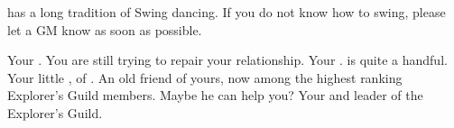 \documentclass[char]{NeptuneBall}
\begin{document}
\begin{itemz}[Notes]
  \item \pAmerica{} has a long tradition of Swing dancing. If you do not know how to swing, please let a GM know as soon as possible.
\end{itemz}

\begin{contacts}
  \contact{\cKing{}} Your \cKing{\parent}. You are still trying to repair your relationship.
  \contact{\cWillow{}} Your \cWillow{\offspring}. \cWillow{\They} is quite a handful.
  \contact{\cPrincess{}} Your little \cPrincess{\sibling}, \cPrincess{\prince} of \pAtlantis{}.
  \contact{\cPriest{}} An old friend of yours, now among the highest ranking Explorer's Guild members. Maybe he can help you?
  \contact{\cPlant{}} Your \cPlant{\uncle} and leader of the Explorer's Guild.
\end{contacts}
\end{document}

